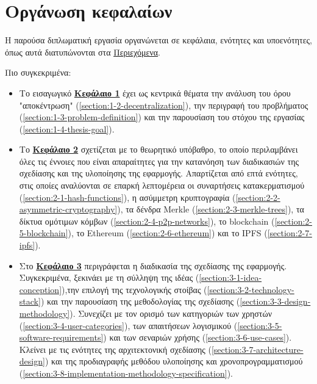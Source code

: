 \section{Οργάνωση κεφαλαίων}\label{section:1-7-document-structure}

Η παρούσα διπλωματική εργασία οργανώνεται σε κεφάλαια, ενότητες και υποενότητες, όπως αυτά διατυπώνονται στα \hyperref[toc]{Περιεχόμενα}.

Πιο συγκεκριμένα:

\begin{itemize}
	\item Το εισαγωγικό \hyperref[chapter:1-introduction]{\textbf{Κεφάλαιο 1}} έχει ως κεντρικά θέματα την ανάλυση του όρου "αποκέντρωση" (\ref{section:1-2-decentralization}), την περιγραφή του προβλήματος (\ref{section:1-3-problem-definition}) και την παρουσίαση του στόχου της εργασίας (\ref{section:1-4-thesis-goal}).
	\item Το \hyperref[chapter:2-theoretical-background]{\textbf{Κεφάλαιο 2}} σχετίζεται με το θεωρητικό υπόβαθρο, το οποίο περιλαμβάνει όλες τις έννοιες που είναι απαραίτητες για την κατανόηση των διαδικασιών της σχεδίασης και της υλοποίησης της εφαρμογής. Απαρτίζεται από επτά ενότητες, στις οποίες αναλύονται σε επαρκή λεπτομέρεια οι συναρτήσεις κατακερματισμού (\ref{section:2-1-hash-functions}), η ασύμμετρη κρυπτογραφία (\ref{section:2-2-asymmetric-cryptography}), τα δένδρα Merkle (\ref{section:2-3-merkle-trees}), τα δίκτυα ομότιμων κόμβων (\ref{section:2-4-p2p-networks}), το blockchain (\ref{section:2-5-blockchain}), το Ethereum (\ref{section:2-6-ethereum}) και το IPFS (\ref{section:2-7-ipfs}).
	\item Στο \hyperref[chapter:3-application-design]{\textbf{Κεφάλαιο 3}} περιγράφεται η διαδικασία της σχεδίασης της εφαρμογής. Συγκεκριμένα, ξεκινάει με τη σύλληψη της ιδέας (\ref{section:3-1-idea-conception}),την επιλογή της τεχνολογικής στοίβας (\ref{section:3-2-technology-stack}) και την παρουσίαση της μεθοδολογίας της σχεδίασης (\ref{section:3-3-design-methodology}). Συνεχίζει με τον ορισμό των κατηγοριών των χρηστών (\ref{section:3-4-user-categories}), των απαιτήσεων λογισμικού (\ref{section:3-5-software-requirements}) και των σεναριών χρήσης (\ref{section:3-6-use-cases}). Κλείνει με τις ενότητες της αρχιτεκτονική σχεδίασης (\ref{section:3-7-architecture-design}) και της
	προδιαγραφής μεθόδου υλοποίησης και χρονοπρογραμματισμού (\ref{section:3-8-implementation-methodology-specification}).

\end{itemize}
